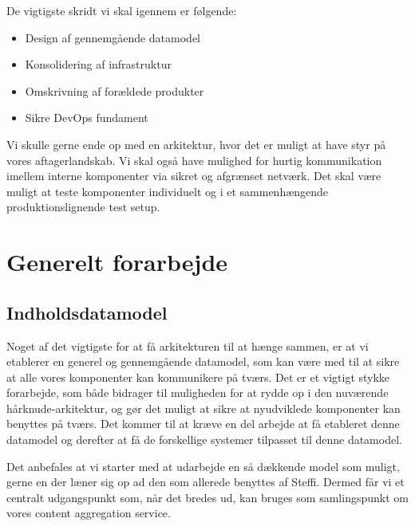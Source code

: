 \documentclass{article}
\begin{document}
De vigtigste skridt vi skal igennem er følgende:
\begin{itemize}
\item Design af gennemgående datamodel
\item Konsolidering af infrastruktur
\item Omskrivning af forældede produkter
\item Sikre DevOps fundament
\end{itemize}
Vi skulle gerne ende op med en arkitektur, hvor det er muligt at have styr på vores aftagerlandskab. Vi skal også have mulighed for hurtig kommunikation imellem interne komponenter via sikret og afgrænset netværk. Det skal være muligt at teste komponenter individuelt og i et sammenhængende produktionslignende test setup.

\section{Generelt forarbejde}
\subsection{Indholdsdatamodel}
Noget af det vigtigste for at få arkitekturen til at hænge sammen, er at vi etablerer en generel og gennemgående datamodel, som kan være med til at sikre at alle vores komponenter kan kommunikere på tværs. Det er et vigtigt stykke forarbejde, som både bidrager til muligheden for at rydde op i den nuværende hårknude-arkitektur, og gør det muligt at sikre at nyudviklede komponenter kan benyttes på tværs. Det kommer til at kræve en del arbejde at få etableret denne datamodel og derefter at få de forskellige systemer tilpasset til denne datamodel.

Det anbefales at vi starter med at udarbejde en så dækkende model som muligt, gerne en der læner sig op ad den som allerede benyttes af Steffi. Dermed får vi et centralt udgangspunkt som, når det bredes ud, kan bruges som samlingspunkt om vores content aggregation service.
\end{document}
